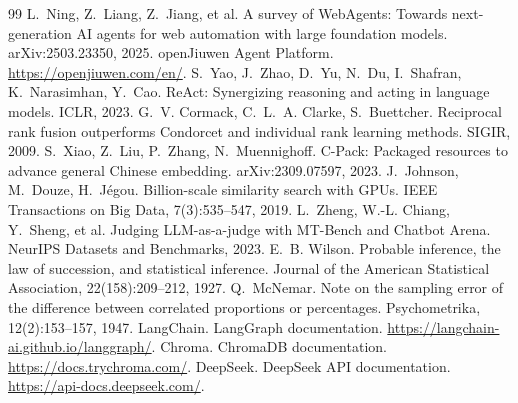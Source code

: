 \documentclass[12pt,a4paper]{article}
\begin{document}
\begingroup
\small
\begin{thebibliography}{99}
\setlength{\itemsep}{1pt}
 L.~Ning, Z.~Liang, Z.~Jiang, et al. A survey of WebAgents: Towards next-generation AI agents for web automation with large foundation models. arXiv:2503.23350, 2025.
 openJiuwen Agent Platform. \url{https://openjiuwen.com/en/}.
 S.~Yao, J.~Zhao, D.~Yu, N.~Du, I.~Shafran, K.~Narasimhan, Y.~Cao. ReAct: Synergizing reasoning and acting in language models. ICLR, 2023.
 G.~V. Cormack, C.~L.~A. Clarke, S.~Buettcher. Reciprocal rank fusion outperforms Condorcet and individual rank learning methods. SIGIR, 2009.
 S.~Xiao, Z.~Liu, P.~Zhang, N.~Muennighoff. C-Pack: Packaged resources to advance general Chinese embedding. arXiv:2309.07597, 2023.
 J.~Johnson, M.~Douze, H.~J\'egou. Billion-scale similarity search with GPUs. IEEE Transactions on Big Data, 7(3):535--547, 2019.
 L.~Zheng, W.-L. Chiang, Y.~Sheng, et al. Judging LLM-as-a-judge with MT-Bench and Chatbot Arena. NeurIPS Datasets and Benchmarks, 2023.
 E.~B. Wilson. Probable inference, the law of succession, and statistical inference. Journal of the American Statistical Association, 22(158):209--212, 1927.
 Q.~McNemar. Note on the sampling error of the difference between correlated proportions or percentages. Psychometrika, 12(2):153--157, 1947.
 LangChain. LangGraph documentation. \url{https://langchain-ai.github.io/langgraph/}.
 Chroma. ChromaDB documentation. \url{https://docs.trychroma.com/}.
 DeepSeek. DeepSeek API documentation. \url{https://api-docs.deepseek.com/}.
\end{thebibliography}
\endgroup
\end{document}
